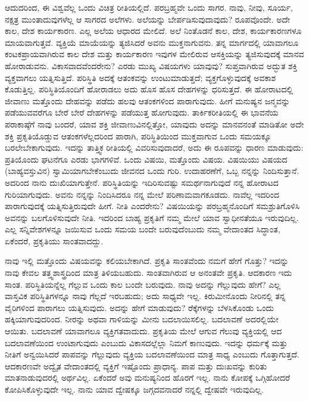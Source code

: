 \vskip 0.2cm 

ಆದುದರಿಂದ, ಈ ವಿಶ್ವವೆಲ್ಲ ಒಂದು ವಿಚಿತ್ರ ರೀತಿಯಲ್ಲಿದೆ. ಪರಬ್ರಹ್ಮವೇ ಒಂದು ಸಾಗರ. ನಾವು, ನೀವು, ಸೂರ್ಯ, ನಕ್ಷತ್ರ ಮುಂತಾದುವುಗಳೆಲ್ಲ ಆ ಸಾಗರದ ಅಲೆಗಳು. ಅಲೆಯನ್ನು ಬೇರ್ಪಡಿಸುವುದಾವುದು? ರೂಪವೊಂದೇ. ಅದೇ ಕಾಲ, ದೇಶ ಕಾರ್ಯಕಾರಣ. ಎಲ್ಲ ಅಲೆಯ ಆಧಾರದ ಮೇಲಿದೆ. ಅಲೆ ನಿಂತೊಡನೆ ಕಾಲ, ದೇಶ, ಕಾರ್ಯಕಾರಣಗಳೂ ಮಾಯವಾಗುತ್ತವೆ. ವ್ಯಕ್ತಿಯೆ ಮಾಯೆಯನ್ನು ತ್ಯಜಿಸಿದರೆ ಅವನು ಮುಕ್ತನಾಗುವನು. ತನ್ನ ಮಾರ್ಗದಲ್ಲಿ ಯಾವಾಗಲೂ ಕಂಟಕಪ್ರಾಯವಾಗಿರುವ ಕಾಲ ದೇಶ ಮತ್ತು ಕಾರ್ಯಕಾರಣ ಇವುಗಳ ಮೇಲಿರುವ ಆಸಕ್ತಿಯನ್ನು ತ್ಯಜಿಸುವುದಕ್ಕೆ ಮಾನವ ಹೋರಾಡುವನು. ವಿಕಾಸವಾದವೆಂದರೇನು? ಎರಡು ಮುಖ್ಯ ವಿಷಯಗಳು ಯಾವುವು? ಸುಪ್ತವಾಗಿರುವ ಅದ್ಭುತ ಶಕ್ತಿ ವ್ಯಕ್ತವಾಗಲು ಯತ್ನಿಸುತ್ತಿದೆ. ಪರಿಸ್ಥಿತಿ ಅದಕ್ಕೆ ಆತಂಕವನ್ನು ಉಂಟುಮಾಡುತ್ತದೆ; ವ್ಯಕ್ತಗೊಳ್ಳುವುದಕ್ಕೆ ಅವಕಾಶ ಕೊಡುತ್ತಿಲ್ಲ. ಪರಿಸ್ಥಿತಿಯೊಂದಿಗೆ ಹೋರಾಡಲು ಅದು ಹೊಸ ಹೊಸ ದೇಹಗಳನ್ನು ಧರಿಸುತ್ತದೆ. ಈ ಹೋರಾಟದಲ್ಲಿ ಜೀವಾಣು ಮತ್ತೊಂದು ದೇಹವನ್ನು ಪಡೆದು ಹಲವು ಆತಂಕಗಳಿಂದ ಪಾರಾಗುವುದು. ಹೀಗೆ ಮನುಷ್ಯನ ಜನ್ಮವನ್ನು ಪಡೆಯುವವರೆಗೂ ಬೇರೆ ಬೇರೆ ದೇಹಗಳನ್ನು ಪಡೆಯುತ್ತ ಹೋಗುವುದು. ತಾರ್ಕಿಕರೀತಿಯಲ್ಲಿ ಈ ಭಾವನೆಯ ಪರಾಕಾಷ್ಠೆಗೆ ನಾವು ಬಂದರೆ, ಯಾವ ಶಕ್ತಿ ಜೀವಾಣುವಿನಲ್ಲಿತ್ತೋ, ಯಾವುದು ಅದನ್ನು ಮಾನವನಂತೆ ಮಾಡಿತೋ ಅದೇ ಶಕ್ತಿ ಪ್ರಕೃತಿಯೊಡ್ಡುವ ಆತಂಕಗಳೆಲ್ಲದರಿಂದ ಪಾರಾಗಿ, ಪರಿಸ್ಥಿತಿಯಿಂದ ಮುಕ್ತವಾಗುವ ಒಂದು ಸಮಯಕ್ಕೂ ಬರಲೇಬೇಕಾಗುವುದು. ಇದನ್ನು ತಾತ್ತ್ವಿಕ ರೀತಿಯಲ್ಲಿ ವಿವರಿಸುವುದಾದರೆ, ಅದು ಈ ರೂಪವನ್ನು ಧಾರಣ ಮಾಡುವುದು: ಪ್ರತಿಯೊಂದು ಘಟನೆಗೂ ಎರಡು ಭಾಗಗಳಿವೆ. ಒಂದು ವಿಷಯಿ, ಮತ್ತೊಂದು ವಿಷಯ. ವಿಷಯಿಯು ವಿಷಯದ (ಬಾಹ್ಯವಸ್ತುವಿನ) ಸ್ವಾಮಿಯಾಗಬೇಕೆಂಬುದು ಜೀವನದ ಒಂದು ಗುರಿ. ಉದಾಹರಣೆಗೆ, ಒಬ್ಬ ನನ್ನನ್ನು ನಿಂದಿಸುತ್ತಾನೆ. ಅದರಿಂದ ನಾನು ದುಃಖಿಯಾಗುತ್ತೇನೆ. ಪರಿಸ್ಥಿತಿಯನ್ನು ಇದಿರಿಸುವಷ್ಟು ಸಮರ್ಥನಾಗುವುದೆ ನನ್ನ ಹೋರಾಟದ ಗುರಿಯಾಗುವುದು. ಅವನು ನನ್ನನ್ನು ನಿಂದಿಸಿದರೂ ನನ್ನ ಮೇಲೆ ಪರಿಣಾಮವಾಗಕೂಡದು. ನಾವೆಲ್ಲ ಇದರಿಂದ ಪಾರಾಗುವುದಕ್ಕೆ ಯತ್ನಿಸುತ್ತಿರುವುದೇ ಹೀಗೆ. ನೀತಿ ಎಂದರೇನು? ವಿಷಯಿಯನ್ನು ಪರಬ್ರಹ್ಮನೊಂದಿಗೆ ಸಮಶ್ರುತಿಗೊಳಿಸಿ ಅವನನ್ನು ಬಲಗೊಳಿಸುವುದೇ ನೀತಿ. ಇದರಿಂದ ಬಾಹ್ಯ ಪ್ರಕೃತಿಗೆ ನಮ್ಮ ಮೇಲೆ ಯಾವ ಸ್ವಾಧೀನತೆಯೂ ಇರುವುದಿಲ್ಲ. ಎಲ್ಲ ಸನ್ನಿವೇಶಗಳನ್ನೂ ಜಯಿಸುವ ಒಂದು ಸಮಯ ಬಂದೇ ಬರುವುದೆಂಬುದು ನಮ್ಮ ವೇದಾಂತದ ಸಿದ್ಧಾಂತ, ಏಕೆಂದರೆ, ಪ್ರಕೃತಿಯು ಸಾಂತವಾದದ್ದು.

\vskip 0.2cm 

ನಾವು ಇಲ್ಲಿ ಮತ್ತೊಂದು ವಿಷಯವನ್ನು ಕಲಿಯಬೇಕಾಗಿದೆ. ಪ್ರಕೃತಿ ಸಾಂತವೆಂದು ನಮಗೆ ಹೇಗೆ ಗೊತ್ತು? ಇದನ್ನು ನಾವು ಕೇವಲ ತತ್ತ್ವಶಾಸ್ತ್ರದಿಂದ ಮಾತ್ರ ತಿಳಿಯಬಹುದು. ಸಾಂತವಾಗಿರುವ ಆ ಅನಂತವೇ ಪ್ರಕೃತಿ. ಆದಕಾರಣ ಇದು ಸಾಂತ. ಪರಿಸ್ಥಿತಿಯನ್ನೆಲ್ಲ ಗೆಲ್ಲುವ ಒಂದು ಕಾಲ ಬಂದೇ ಬರುವುದು. ನಾವು ಅದನ್ನು ಗೆಲ್ಲುವುದು ಹೇಗೆ? ಎಲ್ಲ ವಾಸ್ತವಿಕ ಪರಿಸ್ಥಿತಿಗಳನ್ನೂ ನಾವು ಗೆಲ್ಲದೆ ಇರಬಹುದು; ಅದು ಸಾಧ್ಯವೇ ಇಲ್ಲ. ಕಿರುಮೀನೊಂದು ನೀರಿನಲ್ಲಿ ತನ್ನ ವೈರಿಗಳಿಂದ ಪಾರಾಗಲು ಯತ್ನಿಸುವುದು. ಅದನ್ನು ಹೇಗೆ ಮಾಡುವುದು? ರೆಕ್ಕೆಗಳನ್ನು ಬೆಳಸಿಕೊಂಡು ಒಂದು ಹಕ್ಕಿಯಾಗುವುದರಿಂದ. ನೀರನ್ನು ಅಥವಾ ಗಾಳಿಯನ್ನು ಮೀನು ಬದಲಾಯಿಸಲಿಲ್ಲ. ಬದಲಾವಣೆ ಅದರಲ್ಲಿಯೇ ಆಯಿತು. ಬದಲಾವಣೆ ಯಾವಾಗಲೂ ವ್ಯಕ್ತಿಗತವಾದುದು. ಪ್ರಕೃತಿಯ ಮೇಲೆ ಆಗುವ ಗೆಲುವು ವ್ಯಕ್ತಿಯಲ್ಲಿ ಆದ ಬದಲಾವಣೆಯಿಂದ ಉಂಟಾಗುವುದು ಎಂಬುದು ವಿಕಾಸದಲ್ಲೆಲ್ಲಾ ನಿಮಗೆ ಕಾಣುವುದು. ಇದನ್ನು ಧರ್ಮಕ್ಕೆ ಮತ್ತು ನೀತಿಗೆ ಅನ್ವಯಿಸಿದರೆ ಪಾಪವನ್ನು ಗೆಲ್ಲುವುದು ವ್ಯಕ್ತಿಯ ಬದಲಾವಣೆಯಿಂದ ಮಾತ್ರ ಸಾಧ್ಯ ಎಂಬುದು ಗೊತ್ತಾಗುತ್ತದೆ. ಆದಕಾರಣವೇ ಅದ್ವೈತ ವೇದಾಂತದಲ್ಲಿ ವ್ಯಕ್ತಿಗೆ ಇಷ್ಟೊಂದು ಪ್ರಾಧಾನ್ಯ. ಪಾಪ ಮತ್ತು ದುಃಖವನ್ನು ಕುರಿತು ಮಾತನಾಡುವುದರಲ್ಲಿ ಅರ್ಥವಿಲ್ಲ. ಏಕೆಂದರೆ ಅವು ಮನುಷ್ಯನಿಂದ ಹೊರಗೆ ಇಲ್ಲ. ನಾನು ಕೋಪಕ್ಕೆ ಒಗ್ಗಿಹೋದರೆ ಕೋಪಿಸಿಕೊಳ್ಳುವುದೇ ಇಲ್ಲ. ನಾನು ಯಾವ ದ್ವೇಷಕ್ಕೂ ಜಗ್ಗದವನಾದರೆ ನನ್ನಲ್ಲಿ ದ್ವೇಷವೇ ಇರುವುದಿಲ್ಲ.

